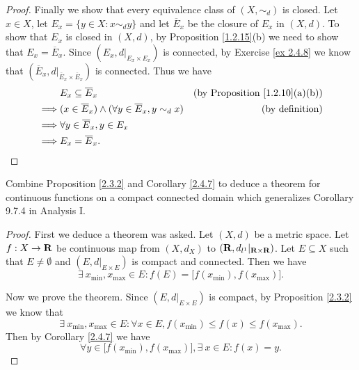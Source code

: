 \begin{proof}
    Finally we show that every equivalence class of \((X, \sim_d)\) is closed.
    Let \(x \in X\), let \(E_x = \{y \in X : x \sim_d y\}\) and let \(\overline{E}_x\) be the closure of \(E_x\) in \((X, d)\).
    To show that \(E_x\) is closed in \((X, d)\), by Proposition \ref{1.2.15}(b) we need to show that \(E_x = \overline{E}_x\).
    Since \((E_x, d|_{E_x \times E_x})\) is connected, by Exercise \ref{ex 2.4.8} we know that \((\overline{E}_x, d|_{\overline{E}_x \times \overline{E}_x})\) is connected.
    Thus we have
    \begin{align*}
                 & E_x \subseteq \overline{E}_x                                            & \text{(by Proposition \ref{1.2.10}(a)(b))} \\
        \implies & (x \in \overline{E}_x) \land (\forall y \in \overline{E}_x, y \sim_d x) & \text{(by definition)}                     \\
        \implies & \forall y \in \overline{E}_x, y \in E_x                                                                              \\
        \implies & E_x = \overline{E}_x.
    \end{align*}
\end{proof}

\begin{exercise}\label{ex 2.4.10}
    Combine Proposition \ref{2.3.2} and Corollary \ref{2.4.7} to deduce a theorem for continuous functions on a compact connected domain which generalizes Corollary 9.7.4 in Analysis I.
\end{exercise}

\begin{proof}
    First we deduce a theorem was asked.
    Let \((X, d)\) be a metric space.
    Let \(f : X \to \mathbf{R}\) be continuous map from \((X, d_X)\) to \((\mathbf{R}, d_{l^1}|_{\mathbf{R} \times \mathbf{R}})\).
    Let \(E \subseteq X\) such that \(E \neq \emptyset\) and \((E, d|_{E \times E})\) is compact and connected.
    Then we have
    \[
        \exists\ x_{\min}, x_{\max} \in E : f(E) = \big[f(x_{\min}), f(x_{\max})\big].
    \]

    Now we prove the theorem.
    Since \((E, d|_{E \times E})\) is compact, by Proposition \ref{2.3.2} we know that
    \[
        \exists\ x_{\min}, x_{\max} \in E : \forall x \in E, f(x_{\min}) \leq f(x) \leq f(x_{\max}).
    \]
    Then by Corollary \ref{2.4.7} we have
    \[
        \forall y \in \big[f(x_{\min}), f(x_{\max})\big], \exists\ x \in E : f(x) = y.
    \]
\end{proof}